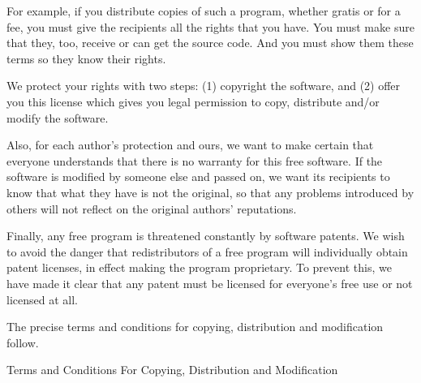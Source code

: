 \documentclass{article}
\begin{document}
      For example, if you distribute copies of such a program, whether gratis or
      for a fee, you must give the recipients all the rights that you have.  You
      must make sure that they, too, receive or can get the source code.  And
      you must show them these terms so they know their rights.
      
      We protect your rights with two steps: (1) copyright the software, and (2)
      offer you this license which gives you legal permission to copy,
      distribute and/or modify the software.
      
      Also, for each author's protection and ours, we want to make certain that
      everyone understands that there is no warranty for this free software.  If
      the software is modified by someone else and passed on, we want its
      recipients to know that what they have is not the original, so that any
      problems introduced by others will not reflect on the original authors'
      reputations.
      
      Finally, any free program is threatened constantly by software patents.
      We wish to avoid the danger that redistributors of a free program will
      individually obtain patent licenses, in effect making the program
      proprietary.  To prevent this, we have made it clear that any patent must
      be licensed for everyone's free use or not licensed at all.
      
      The precise terms and conditions for copying, distribution and
      modification follow.
      
      \begin{center}
      {\Large \sc Terms and Conditions For Copying, Distribution and
        Modification}
      \end{center}
      
\end{document}
